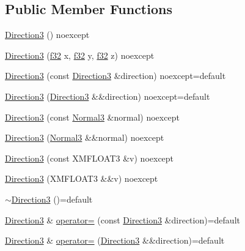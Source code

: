 \subsection*{Public Member Functions}
\begin{DoxyCompactItemize}
\item 
\hyperlink{structmage_1_1_direction3_a1c3d06aa13b207f86df36f5f3cfe486a}{Direction3} () noexcept
\item 
\hyperlink{structmage_1_1_direction3_a55aade58b37a87e820b8483c80793de5}{Direction3} (\hyperlink{namespacemage_a6a44ad388483959dc4dff9f2aef91431}{f32} x, \hyperlink{namespacemage_a6a44ad388483959dc4dff9f2aef91431}{f32} y, \hyperlink{namespacemage_a6a44ad388483959dc4dff9f2aef91431}{f32} z) noexcept
\item 
\hyperlink{structmage_1_1_direction3_acc17dc74c832499081124b706058d813}{Direction3} (const \hyperlink{structmage_1_1_direction3}{Direction3} \&direction) noexcept=default
\item 
\hyperlink{structmage_1_1_direction3_a3852489e86ad55937e50aa17b15ccd05}{Direction3} (\hyperlink{structmage_1_1_direction3}{Direction3} \&\&direction) noexcept=default
\item 
\hyperlink{structmage_1_1_direction3_a3f4daf4fbf2e873bcf9133eca22fad34}{Direction3} (const \hyperlink{structmage_1_1_normal3}{Normal3} \&normal) noexcept
\item 
\hyperlink{structmage_1_1_direction3_ae9b26ed667537e7751b495058bb71de0}{Direction3} (\hyperlink{structmage_1_1_normal3}{Normal3} \&\&normal) noexcept
\item 
\hyperlink{structmage_1_1_direction3_a1230915b5196dfb1f453a612837f2cce}{Direction3} (const X\+M\+F\+L\+O\+A\+T3 \&v) noexcept
\item 
\hyperlink{structmage_1_1_direction3_a93492f00127daa470f69afaa08603759}{Direction3} (X\+M\+F\+L\+O\+A\+T3 \&\&v) noexcept
\item 
\hyperlink{structmage_1_1_direction3_a583c087dc366d206aaf54a33bc90c50b}{$\sim$\+Direction3} ()=default
\item 
\hyperlink{structmage_1_1_direction3}{Direction3} \& \hyperlink{structmage_1_1_direction3_a474a3c1ecf07954ff598933cef4f85f4}{operator=} (const \hyperlink{structmage_1_1_direction3}{Direction3} \&direction)=default
\item 
\hyperlink{structmage_1_1_direction3}{Direction3} \& \hyperlink{structmage_1_1_direction3_aac5690f3f40ba12f4e9eb09f5d2fb7f7}{operator=} (\hyperlink{structmage_1_1_direction3}{Direction3} \&\&direction)=default
\end{DoxyCompactItemize}


